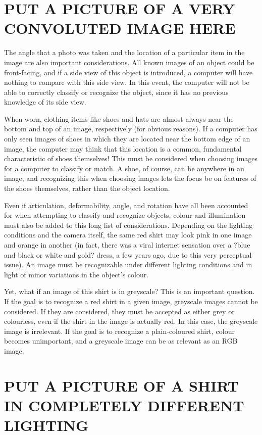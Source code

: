 \documentclass[12pt]{article} %
\begin{document}
 \section{PUT A PICTURE OF A  VERY CONVOLUTED IMAGE HERE }

	The angle that a photo was taken and the location of a particular item in the image are also important considerations. All known images of an object could be front-facing, and if a side view of this object is introduced, a computer will have nothing to compare with this side view. In this event, the computer will not be able to correctly classify or recognize the object, since it has no previous knowledge of its side view. 

When worn, clothing items like shoes and hats are almost always near the bottom and top of an image, respectively (for obvious reasons). If a computer has only seen images of shoes in which they are located near the bottom edge of an image, the computer may think that this location is a common, fundamental characteristic of shoes themselves! This must be considered when choosing images for a computer to classify or match. A shoe, of course, can be anywhere in an image, and recognizing this when choosing images lets the focus be on features of the shoes themselves, rather than the object location. 
	
	Even if articulation, deformability, angle, and rotation have all been accounted for when attempting to classify and recognize objects, colour and illumination must also be added to this long list of considerations. Depending on the lighting conditions and the camera itself, the same red shirt may look pink in one image and orange in another (in fact, there was a viral internet sensation over a ?blue and black or white and gold? dress, a few years ago, due to this very perceptual issue). An image must be recognizable under different lighting conditions and in light of minor variations in the object's colour. 

Yet, what if an image of this shirt is in greyscale? This is an important question. If the goal is to recognize a red shirt in a given image, greyscale images cannot be considered. If they are considered, they must be accepted as either grey or colourless, even if the shirt in the image is actually red. In this case, the greyscale image is irrelevant. If the goal is to recognize a plain-coloured shirt, colour becomes unimportant, and a greyscale image can be as relevant as an RGB image.
	
 \section{PUT A PICTURE OF A SHIRT IN COMPLETELY DIFFERENT LIGHTING}
	
\end{document}
